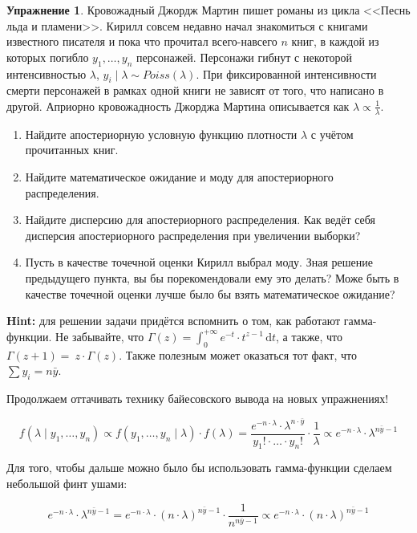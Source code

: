 \documentclass[12pt, a4paper, oneside]{extreport}
\newcommand{\dx}[1]{\,\mathrm{d}#1} %
\theoremstyle{plain}              %
\theoremstyle{definition}         %
\newtheorem{problem}{\color{myblue} Упражнение}
\begin{document}
\begin{problem}
Кровожадный Джордж Мартин пишет романы из цикла <<Песнь льда и пламени>>. Кирилл совсем недавно начал знакомиться с книгами известного писателя и пока что прочитал всего-навсего $n$ книг, в каждой из которых погибло $y_1, \ldots, y_n$ персонажей. Персонажи гибнут с некоторой интенсивностью $\lambda$, $y_i \mid \lambda \sim Poiss(\lambda)$. При фиксированной интенсивности смерти персонажей в рамках одной книги не зависят от того, что написано в другой. Априорно кровожадность Джорджа Мартина описывается как $\lambda \propto \frac{1}{\lambda}$.

\begin{enumerate}
\item Найдите апостериорную условную функцию плотности $\lambda$ с учётом прочитанных книг.
\item Найдите математическое ожидание и моду для апостериорного распределения.
\item Найдите дисперсию для апостериорного распределения. Как ведёт себя дисперсия апостериорного распределения при увеличении выборки? 
\item Пусть в качестве точечной оценки Кирилл выбрал моду. Зная решение предыдущего пункта, вы бы порекомендовали ему это делать? Може быть в качестве точечной оценки лучше было бы взять математическое ожидание?
\end{enumerate}

\textbf{Hint:} для решении задачи придётся вспомнить о том, как работают гамма-функции. Не забывайте, что $ \Gamma(z) = \int_0^{+\infty} e^{-t} \cdot t^{z-1} \dx{t}$, а также, что $\Gamma(z+1) = \ z \cdot \Gamma(z)$. Также полезным может оказаться тот факт, что $\sum y_i = n \bar y$.

\begin{sol}

Продолжаем оттачивать технику байесовского вывода на новых упражнениях!

\[ f(\lambda \mid y_1, \ldots, y_n) \propto f(y_1, \dots, y_n \mid \lambda) \cdot f(\lambda) = \frac{e^{-n \cdot \lambda} \cdot \lambda^{n \cdot \bar y}}{y_1! \cdot \ldots \cdot y_n!} \cdot \frac{1}{\lambda} \propto e^{-n \cdot \lambda} \cdot \lambda^{n \bar y - 1} \]

Для того, чтобы дальше можно было бы использовать гамма-функции сделаем небольшой финт ушами:

\[ e^{-n \cdot \lambda} \cdot \lambda^{n \bar y - 1} = e^{-n \cdot \lambda} \cdot (n \cdot\lambda)^{n \bar y - 1} \cdot \frac{1}{n^{n \bar y - 1}} \propto e^{-n \cdot \lambda} \cdot (n \cdot\lambda)^{n \bar y - 1} \]


\end{sol}
\end{problem}
\end{document}
